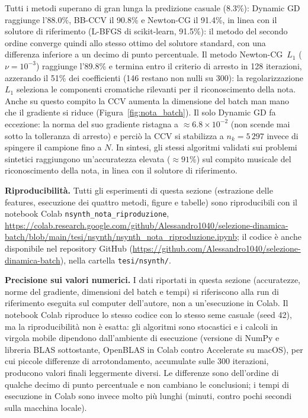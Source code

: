\documentclass[a4paper,12pt]{article}
\numberwithin{equation}{section}
\numberwithin{figure}{section}
\numberwithin{table}{section}
\begin{document}
Tutti i metodi superano di gran lunga la predizione casuale (8.3\%): Dynamic
GD raggiunge l'88.0\%, BB-CCV il 90.8\% e Newton-CG il 91.4\%, in linea con il
solutore di riferimento (L-BFGS di scikit-learn, 91.5\%): il metodo del
secondo ordine converge quindi allo stesso ottimo del solutore standard, con
una differenza inferiore a un decimo di punto percentuale. Il metodo
Newton-CG~$L_1$ ($\nu = 10^{-3}$) raggiunge l'89.8\% e termina entro il
criterio di arresto in 128 iterazioni, azzerando il 51\% dei coefficienti
(146 restano non nulli su 300): la regolarizzazione $L_1$ seleziona le componenti cromatiche
rilevanti per il riconoscimento della nota. Anche su questo compito la CCV
aumenta la dimensione del batch man mano che il gradiente si riduce
(Figura~\ref{fig:nota_batch}). Il solo Dynamic GD fa eccezione: la norma del
suo gradiente ristagna a $\approx 6.8\times10^{-2}$ (non scende mai sotto la
tolleranza di arresto) e perciò la CCV si stabilizza a $n_k = 5\,297$ invece di
spingere il campione fino a $N$. In sintesi, gli stessi algoritmi validati sui
problemi sintetici raggiungono un'accuratezza elevata ($\approx 91\%$) sul
compito musicale del riconoscimento della nota, in linea con il solutore di
riferimento.

\textbf{Riproducibilità.} Tutti gli esperimenti di questa sezione
(estrazione delle features, esecuzione dei quattro metodi, figure e tabelle)
sono riproducibili con il notebook Colab \texttt{nsynth\_nota\_riproduzione},
\url{https://colab.research.google.com/github/Alessandro1040/selezione-dinamica-batch/blob/main/tesi/nsynth/nsynth_nota_riproduzione.ipynb};
il codice è anche disponibile nel repository GitHub
(\url{https://github.com/Alessandro1040/selezione-dinamica-batch}), nella
cartella \texttt{tesi/nsynth/}.

\textbf{Precisione sui valori numerici.} I dati riportati in questa sezione
(accuratezze, norme del gradiente, dimensioni del batch e tempi) si
riferiscono alla run di riferimento eseguita sul computer dell'autore, non a
un'esecuzione in Colab. Il notebook Colab riproduce lo stesso codice con lo
stesso seme casuale (seed 42), ma la riproducibilità non è esatta: gli
algoritmi sono stocastici e i calcoli in virgola mobile dipendono
dall'ambiente di esecuzione (versione di NumPy e libreria BLAS sottostante,
OpenBLAS in Colab contro Accelerate su macOS), per cui piccole differenze di
arrotondamento, accumulate sulle 300 iterazioni, producono valori finali
leggermente diversi. Le differenze sono dell'ordine di qualche decimo di punto
percentuale e non cambiano le conclusioni; i tempi di esecuzione in Colab sono
invece molto più lunghi (minuti, contro pochi secondi sulla macchina locale).
\end{document}
